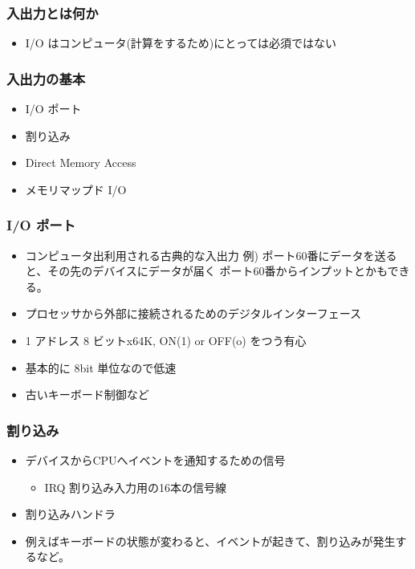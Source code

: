 \documentclass{jsarticle}
\begin{document}
\subsubsection{入出力とは何か}

\begin{itemize}
\item
  I/O はコンピュータ(計算をするため)にとっては必須ではない
\end{itemize}
\subsubsection{入出力の基本}

\begin{itemize}
\item
  I/O ポート
\item
  割り込み
\item
  Direct Memory Access
\item
  メモリマップド I/O
\end{itemize}
\subsubsection{I/O ポート}

\begin{itemize}
\item
  コンピュータ出利用される古典的な入出力 例)
  ポート60番にデータを送ると、その先のデバイスにデータが届く
  ポート60番からインプットとかもできる。
\item
  プロセッサから外部に接続されるためのデジタルインターフェース
\item
  1 アドレス 8 ビットx64K, ON(1) or OFF(o) をつう有心
\item
  基本的に 8bit 単位なので低速
\item
  古いキーボード制御など
\end{itemize}
\subsubsection{割り込み}

\begin{itemize}
\item
  デバイスからCPUへイベントを通知するための信号
  \begin{itemize}
  \item
    IRQ 割り込み入力用の16本の信号線
  \end{itemize}
\item
  割り込みハンドラ
\item
  例えばキーボードの状態が変わると、イベントが起きて、割り込みが発生するなど。
\end{itemize}
\end{document}
